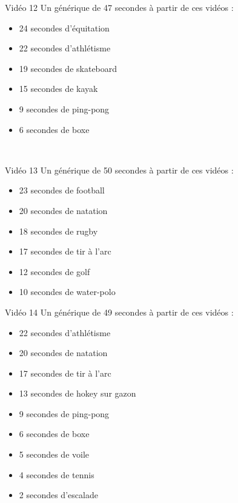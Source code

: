 \documentclass[10pt, a5paper,twoside]{article}
\begin{document}
\vfill

\begin{card}[width = \textwidth, colback = olympicgreen, colframe = olympicgreen, bottomtitle = 2mm]{Vidéo 12}
  Un générique de 47 secondes à partir de ces vidéos :
  \vspace{-1mm}\begin{itemize}
    \item 24 secondes d'équitation
    \item 22 secondes d'athlétisme
    \item 19 secondes de skateboard
    \item 15 secondes de kayak
    \item 9 secondes de ping-pong
    \item 6 secondes de boxe
  \end{itemize}
\end{card}

\vfill

\clearpage
~
\vfill

\begin{card}[width = \textwidth, colback = olympicgreen, colframe = olympicgreen, bottomtitle = 2mm]{Vidéo 13}
  Un générique de 50 secondes à partir de ces vidéos :
  \vspace{-1mm}\begin{itemize}
    \item 23 secondes de football
    \item 20 secondes de natation
    \item 18 secondes de rugby
    \item 17 secondes de tir à l'arc
    \item 12 secondes de golf
    \item 10 secondes de water-polo
  \end{itemize}
\end{card}

\vfill

\begin{card}[width = \textwidth, colback = olympicgreen, colframe = olympicgreen, bottomtitle = 2mm]{Vidéo 14}
  Un générique de 49 secondes à partir de ces vidéos :
  \vspace{-1mm}\begin{itemize}
    \item 22 secondes d'athlétisme
    \item 20 secondes de natation
    \item 17 secondes de tir à l'arc
    \item 13 secondes de hokey sur gazon
    \item 9 secondes de ping-pong
    \item 6 secondes de boxe
    \item 5 secondes de voile
    \item 4 secondes de tennis
    \item 2 secondes d'escalade
  \end{itemize}
\end{card}
\end{document}
